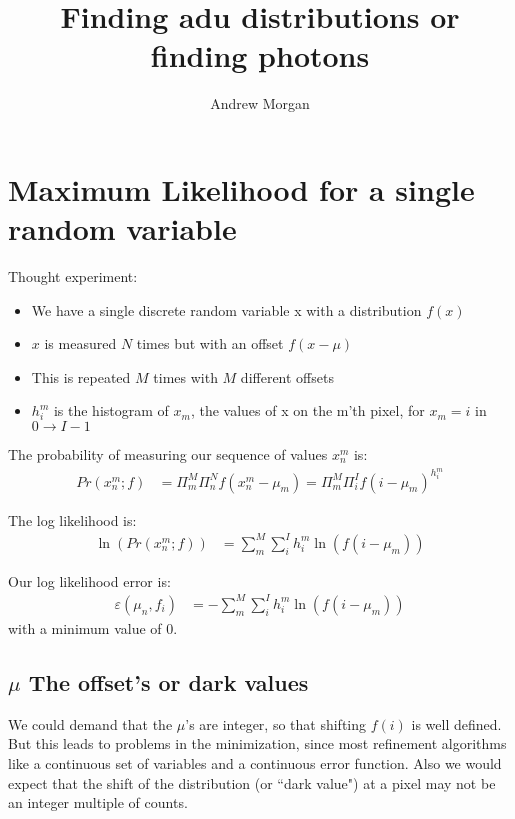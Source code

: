 \documentclass[11pt]{article}
\title{\textbf{Finding adu distributions or finding photons}}
\author{Andrew Morgan}
\date{}
\begin{document}
\maketitle

\section{Maximum Likelihood for a single random variable}
Thought experiment:

\begin{itemize}

  \item We have a single discrete random variable x with a distribution $f(x)$
  \item $x$ is measured $N$ times but with an offset $f(x - \mu)$
  \item This is repeated $M$ times with $M$ different offsets
  \item $h^m_i$ is the histogram of $x_m$, the values of x on the m'th pixel, for $x_m = i$ in $0 \rightarrow I-1$

\end{itemize}


The probability of measuring our sequence of values $ x^m_n $ is:
\begin{align}
   Pr(x^m_n; f) &= \Pi_m^M \Pi_n^N f(x^m_n - \mu_m) = \Pi_m^M \Pi_i^I f(i - \mu_m)^{h^m_i}
\end{align}

The log likelihood is:
\begin{align}
   \ln(Pr(x^m_n; f)) &= \sum_m^M \sum_i^I h^m_i \ln(f(i - \mu_m))
\end{align}

Our log likelihood error is:
\begin{align}
   \varepsilon(\mu_n, f_i) &= -\sum_m^M \sum_i^I h^m_i \ln(f(i - \mu_m))
\end{align}
with a minimum value of 0. 


\subsection{$\mu$ The offset's or dark values}
We could demand that the $\mu$'s are integer, so that shifting $f(i)$ is well defined. But this leads to problems in the minimization, since most refinement algorithms like a continuous set of variables and a continuous error function. Also we would expect that the shift of the distribution (or ``dark value") at a pixel may not be an integer multiple of counts. 
\end{document}

